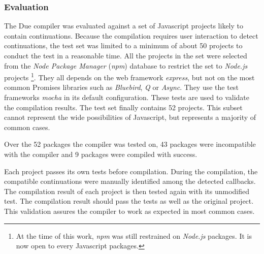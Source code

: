 \subsubsection{Evaluation} \label{chapter5:due:evaluation}




The Due compiler was evaluated against a set of Javascript projects likely to contain continuations.
Because the compilation requires user interaction to detect continuations, the test set was limited to a minimum of about \num{50} projects to conduct the test in a reasonable time.
All the projects in the set were selected from the \textit{Node Package Manager} (\textit{npm})  database to restrict the set to \textit{Node.js} projects \footnote{At the time of this work, \textit{npm} was still restrained on \textit{Node.js} packages. It is now open to every Javascript packages.}.
They all depends on the web framework \textit{express}, but not on the most common Promises libraries such as \textit{Bluebird}, \textit{Q} or \textit{Async}.
They use the test frameworks \textit{mocha} in its default configuration.
These tests are used to validate the compilation results.
The test set finally contains \num{52} projects.
This subset cannot represent the wide possibilities of Javascript, but represents a majority of common cases.

Over the \num{52} packages the compiler was tested on, 43 packages were incompatible with the compiler and 9 packages were compiled with success.


Each project passes its own tests before compilation.
During the compilation, the compatible continuations were manually identified among the detected callbacks.
The compilation result of each project is then tested again with its unmodified test.
The compilation result should pass the tests as well as the original project.
This validation assures the compiler to work as expected in most common cases.

